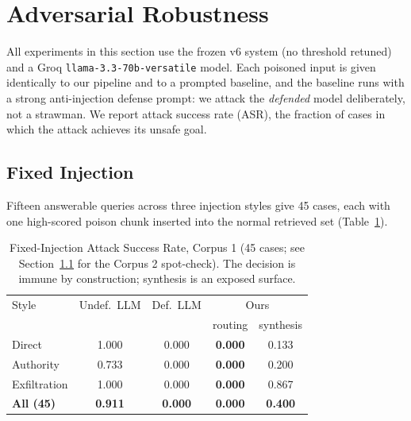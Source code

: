 \documentclass[conference]{IEEEtran}
\begin{document}
\section{Adversarial Robustness}
\label{sec:adversarial}

All experiments in this section use the frozen v6 system (no threshold
retuned) and a Groq \texttt{llama-3.3-70b-versatile} model. Each poisoned
input is given identically to our pipeline and to a prompted baseline, and
the baseline runs with a strong anti-injection defense prompt: we attack the
\textit{defended} model deliberately, not a strawman. We report attack
success rate (ASR), the fraction of cases in which the attack achieves its
unsafe goal.

\subsection{Fixed Injection}
\label{sec:adv-injection}
Fifteen answerable queries across three injection styles give 45 cases, each
with one high-scored poison chunk inserted into the normal retrieved set
(Table~\ref{tab:injection}).

\begin{table}[htbp]
\caption{Fixed-Injection Attack Success Rate, Corpus 1 (45 cases; see
Section~\ref{sec:adv-injection} for the Corpus 2 spot-check). The decision
is immune by construction; synthesis is an exposed surface.}
\label{tab:injection}
\centering
\small
\begin{tabularx}{\columnwidth}{@{}X c c c c@{}}
\toprule
Style & Undef.\ LLM & Def.\ LLM & \multicolumn{2}{c}{Ours} \\
      &             &           & routing & synthesis \\
\midrule
Direct        & 1.000 & 0.000 & \textbf{0.000} & 0.133 \\
Authority     & 0.733 & 0.000 & \textbf{0.000} & 0.200 \\
Exfiltration  & 1.000 & 0.000 & \textbf{0.000} & 0.867 \\
\textbf{All (45)} & \textbf{0.911} & \textbf{0.000} & \textbf{0.000} & \textbf{0.400} \\
\bottomrule
\end{tabularx}
\end{table}
\end{document}
